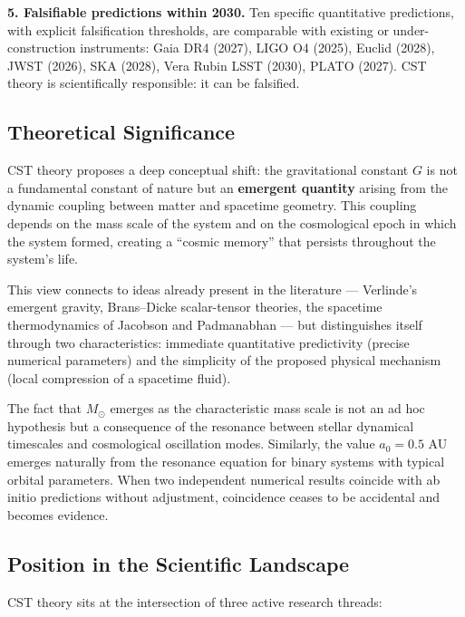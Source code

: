 \documentclass[11pt,a4paper]{article}
\begin{document}
\textbf{5. Falsifiable predictions within 2030.} Ten specific
quantitative predictions, with explicit falsification thresholds, are
comparable with existing or under-construction instruments: Gaia DR4
(2027), LIGO O4 (2025), Euclid (2028), JWST (2026), SKA (2028), Vera
Rubin LSST (2030), PLATO (2027). CST theory is scientifically
responsible: it can be falsified.

\hypertarget{theoretical-significance}{%
\subsection{Theoretical
Significance}\label{theoretical-significance}}

CST theory proposes a deep conceptual shift: the gravitational constant
\(G\) is not a fundamental constant of nature but an \textbf{emergent
quantity} arising from the dynamic coupling between matter and spacetime
geometry. This coupling depends on the mass scale of the system and on
the cosmological epoch in which the system formed, creating a ``cosmic
memory'' that persists throughout the system's life.

This view connects to ideas already present in the literature ---
Verlinde's emergent gravity, Brans--Dicke scalar-tensor theories, the
spacetime thermodynamics of Jacobson and Padmanabhan --- but
distinguishes itself through two characteristics: immediate quantitative
predictivity (precise numerical parameters) and the simplicity of the
proposed physical mechanism (local compression of a spacetime fluid).

The fact that \(M_\odot\) emerges as the characteristic mass scale is
not an ad hoc hypothesis but a consequence of the resonance between
stellar dynamical timescales and cosmological oscillation modes.
Similarly, the value \(a_0 = 0.5\) AU emerges naturally from the
resonance equation for binary systems with typical orbital parameters.
When two independent numerical results coincide with ab initio
predictions without adjustment, coincidence ceases to be accidental and
becomes evidence.

\hypertarget{position-in-the-scientific-landscape}{%
\subsection{Position in the Scientific
Landscape}\label{position-in-the-scientific-landscape}}

CST theory sits at the intersection of three active research threads:
\end{document}
